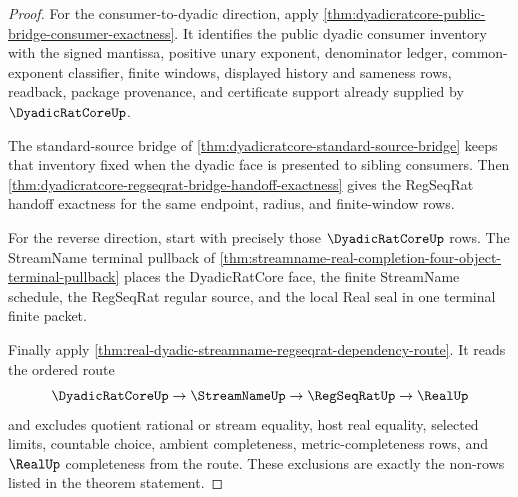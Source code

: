 \begin{proof}
For the consumer-to-dyadic direction, apply
\autoref{thm:dyadicratcore-public-bridge-consumer-exactness}. It identifies
the public dyadic consumer inventory with the signed mantissa, positive unary
exponent, denominator ledger, common-exponent classifier, finite windows,
displayed history and sameness rows, readback, package provenance, and
certificate support already supplied by $\DyadicRatCoreUp$.

The standard-source bridge of
\autoref{thm:dyadicratcore-standard-source-bridge} keeps that inventory fixed
when the dyadic face is presented to sibling consumers. Then
\autoref{thm:dyadicratcore-regseqrat-bridge-handoff-exactness} gives the
RegSeqRat handoff exactness for the same endpoint, radius, and finite-window
rows.

For the reverse direction, start with precisely those $\DyadicRatCoreUp$
rows. The StreamName terminal pullback of
\autoref{thm:streamname-real-completion-four-object-terminal-pullback}
places the DyadicRatCore face, the finite StreamName schedule, the RegSeqRat
regular source, and the local Real seal in one terminal finite packet.

Finally apply
\autoref{thm:real-dyadic-streamname-regseqrat-dependency-route}. It reads the
ordered route
$$
\DyadicRatCoreUp \to \StreamNameUp \to \RegSeqRatUp \to \RealUp
$$
and excludes quotient rational or stream equality, host real equality,
selected limits, countable choice, ambient completeness, metric-completeness
rows, and $\RealUp$ completeness from the route. These exclusions are exactly
the non-rows listed in the theorem statement.
\end{proof}

